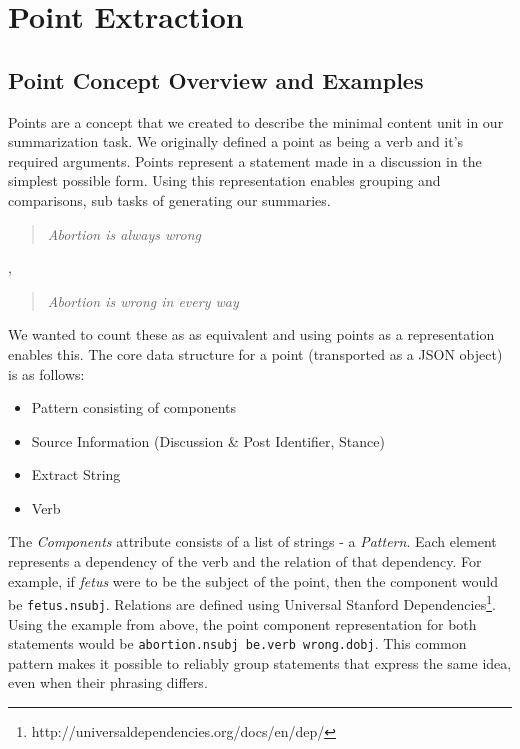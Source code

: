 \chapter{Point Extraction\label{chap:point-extraction}}
  \section{Point Concept Overview and Examples}
    Points are a concept that we created to describe the minimal content unit in our summarization task. We originally defined a point as being a verb and it's required arguments. Points represent a statement made in a discussion in the simplest possible form. Using this representation enables grouping and comparisons, sub tasks of generating our summaries.

    \blockquote{\textit{Abortion is always wrong}}, \blockquote{\textit{Abortion is wrong in every way}}

    We wanted to count these as as equivalent and using points as a representation enables this. The core data structure for a point (transported as a JSON object) is as follows:

    \begin{itemize}
      \item{Pattern consisting of components}
      \item{Source Information (Discussion \& Post Identifier, Stance)}
      \item{Extract String}
      \item{Verb}
    \end{itemize}

    The \textit{Components} attribute consists of a list of strings - a \textit{Pattern}. Each element represents a dependency of the verb and the relation of that dependency. For example, if \textit{fetus} were to be the subject of the point, then the component would be \texttt{fetus.nsubj}. Relations are defined using Universal Stanford Dependencies\footnote{http://universaldependencies.org/docs/en/dep/}. Using the example from above, the point component representation for both statements would be \texttt{abortion.nsubj be.verb wrong.dobj}. This common pattern makes it possible to reliably group statements that express the same idea, even when their phrasing differs.


